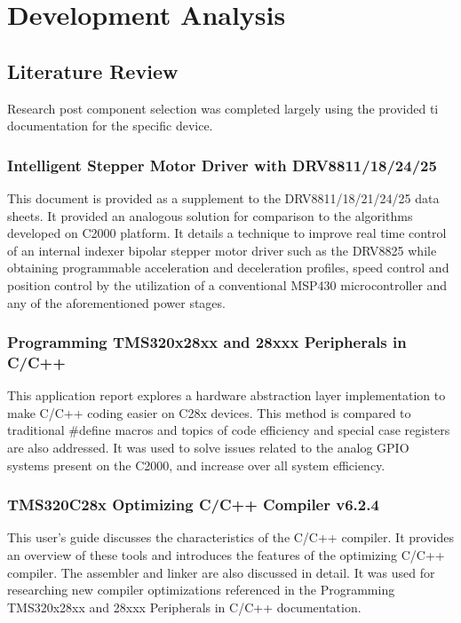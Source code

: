 \chapter{Development Analysis}

\section{Literature Review}
Research post component selection was completed largely using the provided \gls{ti} documentation for the specific device.
\subsection{Intelligent Stepper Motor Driver with DRV8811/18/24/25}
This document is provided as a supplement to the DRV8811/18/21/24/25 data sheets.
It provided an analogous solution for comparison to the algorithms developed on C2000 platform.
It details a technique to improve real time control of an internal indexer bipolar stepper motor driver such as the DRV8825 while obtaining programmable acceleration and deceleration profiles, speed control and position control by the utilization of a conventional MSP430 microcontroller and any of the aforementioned power stages.\cite{dev_intelligent}

\subsection{Programming TMS320x28xx and 28xxx Peripherals in C/C++}
This application report explores a hardware abstraction layer implementation to make C/C++ coding easier on C28x devices.
This method is compared to traditional \#define macros and topics of code efficiency and special case registers are also addressed.\cite{dev_peripherals}
It was used to solve issues related to the analog GPIO systems present on the C2000, and increase over all system efficiency.

\subsection{TMS320C28x Optimizing C/C++ Compiler v6.2.4}
This user's guide discusses the characteristics of the C/C++ compiler.
It provides an overview of these tools and introduces the features of the optimizing C/C++ compiler.
The assembler and linker are also discussed in detail.\cite{dev_optimize}
It was used for researching new compiler optimizations referenced in the Programming TMS320x28xx and 28xxx Peripherals in C/C++ documentation.

